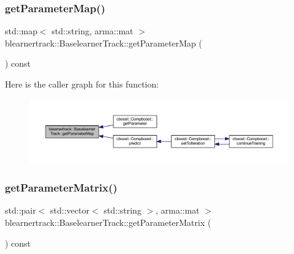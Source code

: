 \subsubsection{\texorpdfstring{get\+Parameter\+Map()}{getParameterMap()}}
{\footnotesize\ttfamily std\+::map$<$ std\+::string, arma\+::mat $>$ blearnertrack\+::\+Baselearner\+Track\+::get\+Parameter\+Map (\begin{DoxyParamCaption}{ }\end{DoxyParamCaption}) const}

Here is the caller graph for this function\+:\nopagebreak
\begin{figure}[H]
\begin{center}
\leavevmode
\includegraphics[width=350pt]{classblearnertrack_1_1_baselearner_track_a0ba8e3943b998b58375b892f40f12c73_icgraph}
\end{center}
\end{figure}
\mbox{\label{classblearnertrack_1_1_baselearner_track_a4b6d2d8b585148c71ed5b6055c9ab08c}} 
\subsubsection{\texorpdfstring{get\+Parameter\+Matrix()}{getParameterMatrix()}}
{\footnotesize\ttfamily std\+::pair$<$ std\+::vector$<$ std\+::string $>$, arma\+::mat $>$ blearnertrack\+::\+Baselearner\+Track\+::get\+Parameter\+Matrix (\begin{DoxyParamCaption}{ }\end{DoxyParamCaption}) const}

